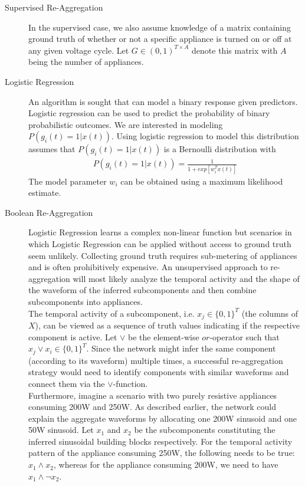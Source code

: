 \begin{description}
\item[Supervised Re-Aggregation] In the supervised case, we also assume knowledge of a matrix containing ground truth of whether or not a specific appliance is turned on or off at any given voltage cycle. Let $G \in (0,1)^{T \times A}$ denote this matrix with $A$ being the number of appliances.
\item[Logistic Regression] An algorithm is sought that can model a binary response given predictors. Logistic regression can be used to predict the probability of binary probabilistic outcomes. We are interested in modeling $P(g_i (t) = 1 | x(t))$. Using logistic regression to model this distribution assumes that $P(g_i (t) = 1 | x(t))$ is a Bernoulli distribution with
\begin{align*}
P(g_i (t) = 1 | x(t)) = \frac{1}{1+exp[w_i^T x(t)]}
\end{align*}
 The model parameter $w_i$ can be obtained using a maximum likelihood estimate.
\item[Boolean Re-Aggregation] Logistic Regression learns a complex non-linear function but scenarios in which Logistic Regression can be applied without access to ground truth seem unlikely. Collecting ground truth requires sub-metering of appliances and is often prohibitively expensive. An unsupervised approach to re-aggregation will most likely analyze the temporal activity and the shape of the waveform of the inferred subcomponents and then combine subcomponents into appliances.\\
The temporal activity of a subcomponent, i.e. $x_j \in \{0,1\}^T$ (the columns of $X$), can be viewed as a sequence of truth values indicating if the respective component is active. Let $\lor$ be the element-wise $or$-operator such that $x_j \lor x_i \in \{0,1\}^T$. Since the network might infer the same component (according to its waveform) multiple times, a successful re-aggregation strategy would need to identify components with similar waveforms and connect them via the $\lor$-function.\\
Furthermore, imagine a scenario with two purely resistive appliances consuming 200W and 250W. As described earlier, the network could explain the aggregate waveforms by allocating one 200W sinusoid and one 50W sinusoid. Let $x_1$ and $x_2$ be the subcomponents constituting the inferred sinusoidal building blocks respectively. For the temporal activity pattern of the appliance consuming 250W, the following needs to be true: $x_1 \land x_2$, whereas for the appliance consuming 200W, we need to have $x_1 \land \neg  x_2$.\\

\end{description}
